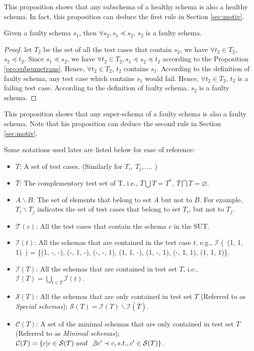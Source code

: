 This proposition shows that any subschema of a healthy schema is also a healthy schema. In fact, this proposition can deduce the first rule in Section \ref{sec:motiv}.


\begin{proposition}\label{pro:superoffaulty}
Given a faulty schema $s_{1}$, then $\forall s_{2}, s_{1} \preceq s_{2}$, $s_{2}$ is a faulty schema.
\end{proposition}

\begin{proof}
let $T_{2}$ be the set of all the test cases that contain $s_{2}$, we have $\forall t_{2} \in T_{2}$, $s_{2} \preceq t_{2}$.  Since $s_{1} \preceq s_{2}$, we have $\forall t_{2} \in T_{2}, s_{1} \preceq s_{2} \preceq t_{2}$ according to the Proposition \ref{pro:subsumetrans}. Hence, $\forall t_{2} \in T_{2}$, $t_{2}$ contains $s_{1}$. According to the definition of faulty schema, any test case which contains $s_{1}$ would fail. Hence, $\forall t_{2} \in T_{2}$, $t_{2}$ is a failing test case. According to the definition of faulty schema. $s_{2}$ is a faulty schema.
\end{proof}

This proposition shows that any super-schema of a faulty schema is also a faulty schema.  Note that his proposition can deduce the second rule in Section \ref{sec:motiv}.


Some notations used later are listed below for ease of reference:
\begin{itemize}
\item $T$: A set of test cases. (Similarly for $T_{i},\ T_{j}, ...$. )
\item $\bar{T}$: The complementary test set of T, i.e., $\bar{T} \bigcup T = T^{*},\ \bar{T} \bigcap T = \varnothing$.
\item $A \backslash B$:  The set of elements that belong to set $A$ but not to $B$. For example, $T_{i} \backslash T_{j}$ indicates the set of test cases that belong to set $T_{i}$, but not to $T_{j}$.
\item $\mathcal{T}(c)$:  All the test cases that contain the schema $c$ in the SUT.
\item $\mathcal{I}(t)$:  All the schemas that are contained in the test case $t$, e.g., $\mathcal{I}$ (\ (1, 1, 1)\ ) = \{(1, -, -), (-, 1, -), (-, -, 1), (1, 1, -), (1, -, 1), (-, 1, 1), (1, 1, 1)\}.
\item $\mathcal{I}(T)$:  All the schemas that are contained in test set $T$, i.e., $\mathcal{I}(T) = \bigcup_{t\in T} \mathcal{I}(t)$.
\item  $\mathcal{S}(T)$:  All the schemas that are only contained in test set $T$ (Referred to as \emph{Special schemas}); $\mathcal{S}(T) =  \mathcal{I}(T) \backslash \mathcal{I}(\bar{T}) $.
\item  $\mathcal{C}(T)$: A set of the minimal schemas that are only contained in test set $T$ (Referred to as \emph{Minimal schemas}); $\mathcal{C}(T) =  \{c | c \in \mathcal{S}(T)\ and\ \not\exists c' \prec c, s.t., c' \in \mathcal{S}(T)\}$.
\end{itemize}

